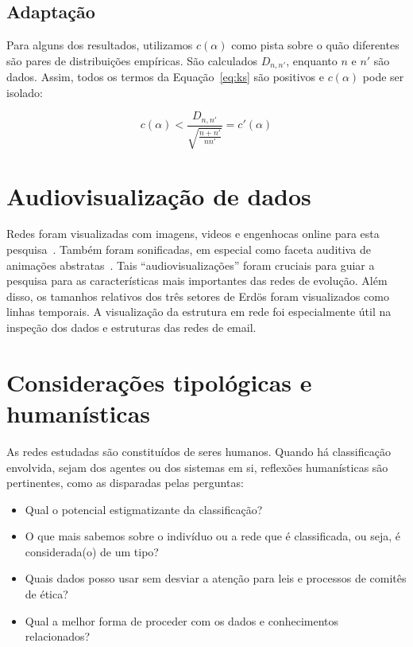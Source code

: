 \documentclass[a4paper,openright,12pt]{report} %
\begin{document}
\subsection{Adaptação}

Para alguns dos resultados, 
utilizamos $c(\alpha)$ como pista sobre
o quão diferentes são pares de distribuições empíricas.
São calculados $D_{n,n'}$, enquanto $n$ e $n'$ são dados.
Assim, todos os termos da Equação~\ref{eq:ks} são positivos
e $c(\alpha)$ pode ser isolado:

\begin{equation}\label{eq:ks2}
c(\alpha) < \frac{D_{n,n'}}{\sqrt{\frac{n+n'}{nn'}}} = c'(\alpha)
\end{equation}

\section{Audiovisualização de dados}
Redes foram visualizadas com imagens, videos e engenhocas online para esta pesquisa~\cite{animacoes,galGMANE,appGMANE}. Também foram sonificadas, em especial como faceta auditiva de animações abstratas~\cite{preludio,4hubs,gmane,social}.
Tais ``audiovisualizações'' foram cruciais para guiar a pesquisa para
as características mais importantes das redes de evolução.
Além disso, os tamanhos relativos dos três setores de Erdös foram visualizados como linhas temporais.
A visualização da estrutura em rede foi especialmente útil na inspeção
dos dados e estruturas das redes de email.

\section{Considerações tipológicas e humanísticas}
As redes estudadas são constituídos de seres humanos.
Quando há classificação envolvida, sejam dos agentes
ou dos sistemas em si, reflexões humanísticas são pertinentes, como as disparadas pelas perguntas:

\begin{itemize}
	\item Qual o potencial estigmatizante da classificação?
	\item O que mais sabemos sobre o indivíduo ou a rede que é classificada, ou seja, é considerada(o) de um tipo?
	\item Quais dados posso usar sem desviar a atenção para leis
		e processos de comitês de ética?
	\item Qual a melhor forma de proceder com os dados e conhecimentos relacionados?
\end{itemize}
\end{document}
